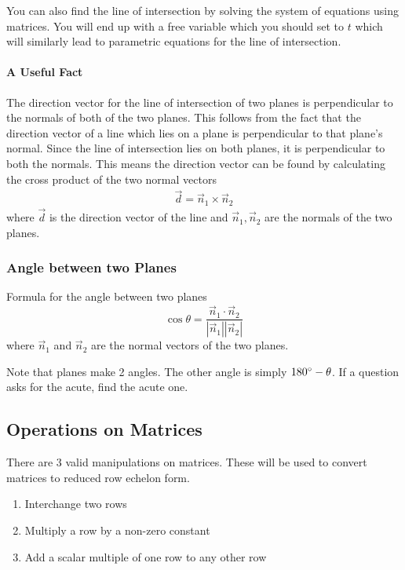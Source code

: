 \documentclass[letterpaper, 12pt]{report}
\theoremstyle{definition}
\numberwithin{equation}{section}
\begin{document}
You can also find the line of intersection by solving the system of equations using matrices. You will end up with a free variable which you should set to $t$ which will similarly lead to parametric equations for the line of intersection.

\paragraph{A Useful Fact}
The direction vector for the line of intersection of two planes is perpendicular to the normals of both of the two planes. 
This follows from the fact that the direction vector of a line which lies on a plane is perpendicular to that plane's normal. Since the line of intersection lies on both planes, it is perpendicular to both the normals.
This means the direction vector can be found by calculating the cross product of the two normal vectors
\begin{align*}
	\vec d = \vec n_1 \times \vec n_2
\end{align*}
where $\vec d$ is the direction vector of the line and $\vec n_1, \vec n_2$ are the normals of the two planes.

\subsubsection{Angle between two Planes}
Formula for the angle between two planes
\begin{equation}
	\cos \theta = \frac{\vec n_1 \cdot \vec n_2}{|\vec n_1||\vec n_2|}
\end{equation}
where $\vec n_1$ and $\vec n_2$ are the normal vectors of the two planes.

Note that planes make 2 angles. The other angle is simply $180 \degree - \theta$. If a question asks for the acute, find the acute one.
\subsection{Operations on Matrices}
There are 3 valid manipulations on matrices. These will be used to convert matrices to reduced row echelon form.
\begin{enumerate}
	\item Interchange two rows
	\item Multiply a row by a non-zero constant
	\item Add a scalar multiple of one row to any other row
\end{enumerate}
\end{document}
